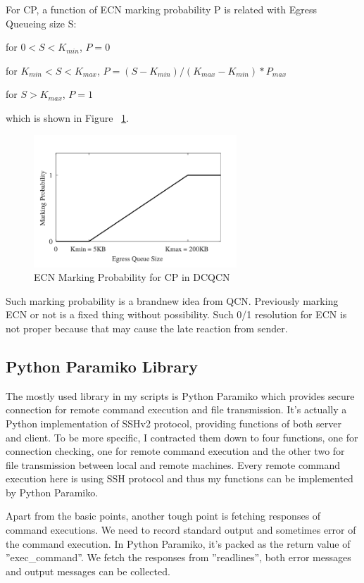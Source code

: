 \documentclass[12pt,a4paper]{article}
\begin{document}
For CP, a function of ECN marking probability P is related with Egress Queueing size S:

for $0<S<K_{min}$, $P = 0$

for $K_{min}<S<K_{max}$, $P = (S - K_{min})/(K_{max} - K_{min})*P_{max}$

for $S>K_{max}$, $P = 1$

which is shown in Figure ~\ref{fig:ECNMarking}.

\begin{figure}[ht]
	\begin{center}
		\includegraphics[width=3in]{ECNMarking}
		\caption{ECN Marking Probability for CP in DCQCN}
		\label{fig:ECNMarking}
	\end{center}
\end{figure}

Such marking probability is a brandnew idea from QCN.
Previously marking ECN or not is a fixed thing without possibility.
Such 0/1 resolution for ECN is not proper because that may cause the late reaction from sender.

\subsection{Python Paramiko Library}

The mostly used library in my scripts is Python Paramiko
which provides secure connection for remote command execution and file transmission.
It's actually a Python implementation of SSHv2 protocol, providing functions of both server and client.
To be more specific, I contracted them down to four functions, one for connection checking,
one for remote command execution and the other two for file transmission between local and remote machines.
Every remote command execution here is using SSH protocol and thus my functions can be implemented by Python Paramiko.

Apart from the basic points, another tough point is fetching responses of command executions.
We need to record standard output and sometimes error of the command execution.
In Python Paramiko, it's packed as the return value of ''exec\_command''.
We fetch the responses from ''readlines'', both error messages and output messages can be collected.
\end{document}
